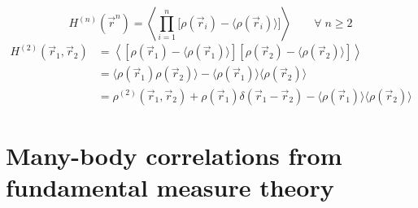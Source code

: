 \documentclass[12pt]{report}
\begin{document}
\begin{equation}
  H^{(n)}(\vec{r}^n) =
  \left\langle
  \prod_{i=1}^n
  \Big[ \rho(\vec{r}_i) - \big\langle\rho(\vec{r}_i)\big\rangle \Big]
  \right\rangle
  \qquad \forall \; n \ge 2
\end{equation}
\begin{equation}
  \begin{aligned}
    H^{(2)}(\vec{r}_1, \vec{r}_2) &=
    \left\langle
    \left[ \rho(\vec{r}_1) - \big\langle\rho(\vec{r}_1)\big\rangle \right]
    \left[ \rho(\vec{r}_2) - \big\langle\rho(\vec{r}_2)\big\rangle \right]
    \right\rangle \\
    &=
    \big\langle \rho(\vec{r}_1) \rho(\vec{r}_2) \big\rangle -
    \big\langle \rho(\vec{r}_1) \big\rangle \big\langle \rho(\vec{r}_2) \big\rangle \\
    &=
    \rho^{(2)}(\vec{r}_1, \vec{r}_2) +
    \rho(\vec{r}_1) \delta(\vec{r}_1 - \vec{r}_2) -
    \big\langle \rho(\vec{r}_1) \big\rangle \big\langle \rho(\vec{r}_2) \big\rangle
  \end{aligned}
\end{equation}

\section{Many-body correlations from fundamental measure theory}
\end{document}
